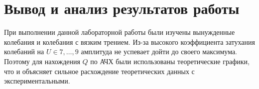 \section{Вывод и анализ результатов работы}
При выполнении данной лабораторной работы были изучены вынужденные колебания и
колебания с вязким трением. 
Из-за высокого коэффициента затухания колебаний на $U \in 7, \ldots, 9$ 
амплитуда не успевает дойти до своего максимума. 
Поэтому для нахождения $Q$ по АЧХ были использованы теоретические графики, что и
объясняет сильное расхождение теоретических данных с экспериментальными.


